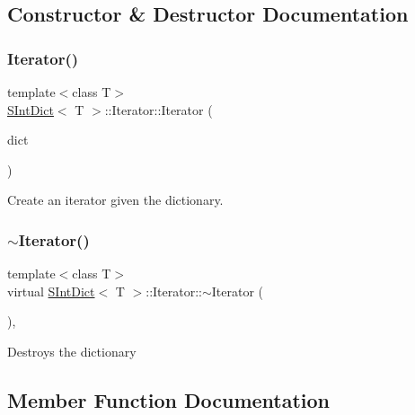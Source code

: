 \subsection{Constructor \& Destructor Documentation}
\mbox{\label{class_s_int_dict_1_1_iterator_ae83e1143c2b3533c2becdd4c4ad5838b}} 
\subsubsection{\texorpdfstring{Iterator()}{Iterator()}}
{\footnotesize\ttfamily template$<$class T$>$ \\
\mbox{\hyperlink{class_s_int_dict}{S\+Int\+Dict}}$<$ T $>$\+::Iterator\+::\+Iterator (\begin{DoxyParamCaption}\item[{const \mbox{\hyperlink{class_s_int_dict}{S\+Int\+Dict}}$<$ T $>$ \&}]{dict }\end{DoxyParamCaption})\hspace{0.3cm}{\ttfamily [inline]}}

Create an iterator given the dictionary. \mbox{\label{class_s_int_dict_1_1_iterator_a1cbe8bd97e0ad5064bbc14ce273931ee}} 
\subsubsection{\texorpdfstring{$\sim$Iterator()}{~Iterator()}}
{\footnotesize\ttfamily template$<$class T$>$ \\
virtual \mbox{\hyperlink{class_s_int_dict}{S\+Int\+Dict}}$<$ T $>$\+::Iterator\+::$\sim$\+Iterator (\begin{DoxyParamCaption}{ }\end{DoxyParamCaption})\hspace{0.3cm}{\ttfamily [inline]}, {\ttfamily [virtual]}}

Destroys the dictionary 

\subsection{Member Function Documentation}
\mbox{\label{class_s_int_dict_1_1_iterator_a8ea5e9661491f570ebf15ba7f7f89a74}} 
